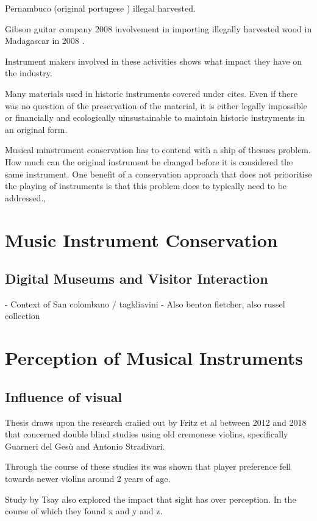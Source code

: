 Pernambuco \cite{toledo_operation_2022} (original portugese \cite{toledo_como_2022}) illegal harvested.

Gibson guitar company 2008 involvement in importing illegally harvested wood in Madagascar in 2008 \cite{justice_gibson_2012}.

Instrument makers involved in these activities shows what impact they have on the industry. 

Many materials used in historic instruments covered under cites. Even if there was no question of the preservation of the material, it is either legally impossible or financially and ecologically uinsustainable to maintain historic instryments in an original form.

Musical minstrument conservation has to contend with a ship of thesues problem. How much can the original instrument be changed before it is considered the same instrument. One benefit of a conservation approach that does not priooritise the playing of instruments is that this problem does to typically need to be addressed.,

\section{Music Instrument Conservation}
\subsection{Digital Museums and Visitor Interaction}
- Context of San colombano / tagkliavini 
- Also benton fletcher, also russel collection
\section{Perception of Musical Instruments}
\subsection{Influence of visual}

Thesis draws upon the research craiied out by Fritz et al between 2012 and 2018 that concerned double blind studies using old cremonese violins, specifically Guarneri del Gesù and Antonio Stradivari.

Through the course of these studies its was shown that player preference fell towards newer violins around 2 years of age.

Study by Tsay \cite{tsay_sight_2013} also explored the impact that sight has over perception. In the course of which they found x and y and z.

